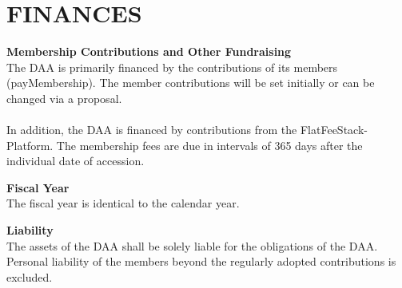 \section{FINANCES}

\item \textbf{Membership Contributions and Other Fundraising} \\
The DAA is primarily financed by the contributions of its members (payMembership).
The member contributions will be set initially or can be changed via a proposal. \\ \\
In addition, the DAA is financed by contributions from the FlatFeeStack-Platform.
The membership fees are due in intervals of 365 days after the individual date of accession.

\item \textbf{Fiscal Year} \\
The fiscal year is identical to the calendar year.

\item \textbf{Liability} \\
The assets of the DAA shall be solely liable for the obligations of the DAA.
Personal liability of the members beyond the regularly adopted contributions is excluded.
